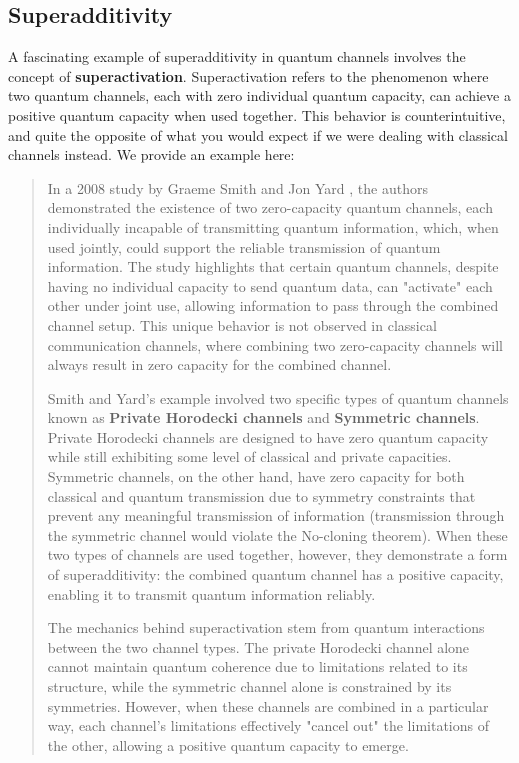 \subsection{Superadditivity}

A fascinating example of superadditivity in quantum channels involves the concept
of \textbf{superactivation}. Superactivation refers to the phenomenon where two
quantum channels, each with zero individual quantum capacity, can achieve a positive
quantum capacity when used together. This behavior is counterintuitive, and quite
the opposite of what you would expect if we were dealing with classical channels
instead. We provide an example here:

\begin{quotation}
    In a 2008 study by Graeme Smith and Jon Yard \cite{Smith_2008}, the authors demonstrated
    the existence of two zero-capacity quantum channels, each individually incapable of
    transmitting quantum information, which, when used jointly, could support the reliable
    transmission of quantum information. The study highlights that certain quantum channels,
    despite having no individual capacity to send quantum data, can "activate" each other
    under joint use, allowing information to pass through the combined channel setup. This
    unique behavior is not observed in classical communication channels, where combining
    two zero-capacity channels will always result in zero capacity for the combined
    channel.

    Smith and Yard's example involved two specific types of quantum channels known as
    \textbf{Private Horodecki channels} and \textbf{Symmetric channels}. Private Horodecki
    channels are designed to have zero quantum capacity while still exhibiting some level
    of classical and private capacities. Symmetric channels, on the other hand, have zero
    capacity for both classical and quantum transmission due to symmetry constraints that
    prevent any meaningful transmission of information (transmission through the symmetric
    channel would violate the No-cloning theorem). When these two types of channels are
    used together, however, they demonstrate a form of superadditivity: the combined
    quantum channel has a positive capacity, enabling it to transmit quantum information
    reliably.

    The mechanics behind superactivation stem from quantum interactions between the two
    channel types. The private Horodecki channel alone cannot maintain quantum coherence
    due to limitations related to its structure, while the symmetric channel alone is
    constrained by its symmetries. However, when these channels are combined in a
    particular way, each channel’s limitations effectively "cancel out" the limitations of
    the other, allowing a positive quantum capacity to emerge.
\end{quotation}

